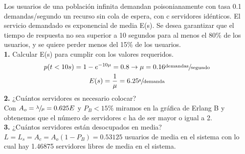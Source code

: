 \begin{exercise}[3]
Los usuarios de una población infinita demandan poisonianamente con tasa 0.1 demandas/segundo un recurso sin cola de espera, con c servidores idénticos. El servicio demandado es exponencial de media E(s). Se desea garantizar que el tiempo de respuesta no sea superior a 10 segundos para al menos el 80\% de los usuarios, y se quiere perder menos del 15\% de los usuarios.\\
\textbf{1.} Calcular E(s) para cumplir con los valores requeridos.\\
\begin{gather*}
p(t<10s)=1-e^{-10\mu}=0.8 \to \mu=0.16\sfrac{\text{demandas}}{\text{segundo}}\\
E(s)=\frac{1}{\mu}=6.25\sfrac{\text{s}}{\text{demanda}}
\end{gather*}
\textbf{2.} ¿Cuántos servidores es necesario colocar?\\
Con $A_o=\sfrac{\lambda}{\mu}=0.625E$ y $P_B<15\%$ miramos en la gráfica de Erlang B y obtenemos que el número de servidores c ha de ser mayor o igual a 2.\\
\textbf{3.} ¿Cuántos servidores están desocupados en media?\\
$L=L_s=A_c=A_o(1-P_B)=0.53125$ usuarios de media en el sistema con lo cual hay 1.46875 servidores libres de media en el sistema.
\end{exercise}